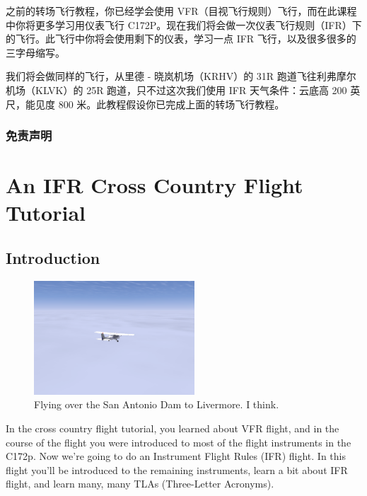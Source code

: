 之前的转场飞行教程，你已经学会使用 VFR（目视飞行规则）飞行，而在此课程中你将更多学习用仪表飞行 C172P。现在我们将会做一次仪表飞行规则（IFR）下的飞行。此飞行中你将会使用剩下的仪表，学习一点 IFR 飞行，以及很多很多的三字母缩写。

我们将会做同样的飞行，从里德 - 晓岚机场（KRHV）的 31R 跑道飞往利弗摩尔机场（KLVK）的 25R 跑道，只不过这次我们使用 IFR 天气条件：云底高 200 英尺，能见度 800 米。此教程假设你已完成上面的转场飞行教程。

\subsection{免责声明}



\chapter{An IFR Cross Country Flight Tutorial}
\label{IFR Tutorial}

\section{Introduction}

\begin{figure}[h]
  \begin{center}
    \includegraphics[width=6cm]{img/somewhere}
    \caption{Flying over the San Antonio Dam to Livermore.  I think.}
    \label{fig:somewhere}
  \end{center}
\end{figure}

In the cross country flight tutorial, you learned about VFR flight,
and in the course of the flight you were introduced to most of the
flight instruments in the C172p.  Now we're going to do an Instrument
Flight Rules (IFR) flight.  In this flight you'll be introduced to the
remaining instruments, learn a bit about IFR flight, and learn many,
many TLAs (Three-Letter Acronyms).

